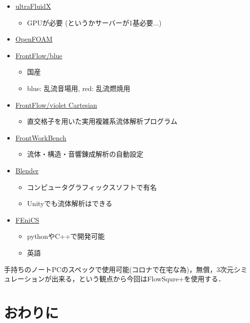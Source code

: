 \begin{itemize}
        \item \href{https://altairhyperworks.jp/product/ultrafluidx}{ultraFluidX}
            \begin{itemize}
            \item GPUが必要 (というかサーバーが1基必要...)
            \end{itemize}
        
        \item \href{https://www.openfoam.com/}{OpenFOAM}
        
        \item \href{http://www.ciss.iis.u-tokyo.ac.jp/dl/}{FrontFlow/blue}
            \begin{itemize}
            \item 国産
            \item blue: 乱流音場用,  red: 乱流燃焼用
            \end{itemize}
        
        \item \href{http://www.cenav.org/kdb/?page_id=328}{FrontFlow/violet Cartesian}
            \begin{itemize}
            \item 直交格子を用いた実用複雑系流体解析プログラム
            \end{itemize}
        
        \item \href{http://www.cenav.org/kdb/?page_id=334}{FrontWorkBench}
            \begin{itemize}
            \item 流体・構造・音響錬成解析の自動設定
            \end{itemize}
        
        \item \href{https://www.blender.org/download/}{Blender}
            \begin{itemize}
            \item コンピュータグラフィックスソフトで有名
            \item Unityでも流体解析はできる
            \end{itemize}

        \item \href{https://fenicsproject.org/}{FEniCS}
            \begin{itemize}
            \item pythonやC++で開発可能
            \item 英語
            \end{itemize}
        
        \end{itemize}

        手持ちのノートPCのスペックで使用可能(コロナで在宅な為)，無償，3次元シミュレーションが出来る，という観点から今回はFlowSqure+を使用する．
        
\section{おわりに}